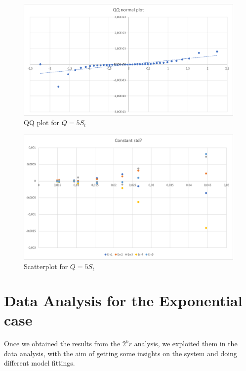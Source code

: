 \documentclass{article}
\begin{document}
                    \begin{figure}[htbp!]
                        \centering
                        \includegraphics[scale=0.6]{images/QQplot_5.png}
                        \caption{QQ plot for $Q = 5{S_t}$}
                        \label{fig:QQplot_5}
                    \end{figure}
                    
                     \begin{figure}[htbp!]
                        \centering
                        \includegraphics[scale=0.55]{images/standardDeviation_5.png}
                        \caption{Scatterplot for $Q = 5{S_t}$}
                        \label{fig:standardDeviation_5}
                    \end{figure}
                    
    \newpage
    
    \section{Data Analysis for the Exponential case}
        Once we obtained the results from the $2^k r$ analysis, we exploited them in the data analysis, with the aim of getting some insights on the system and doing different model fittings.\\
\end{document}
